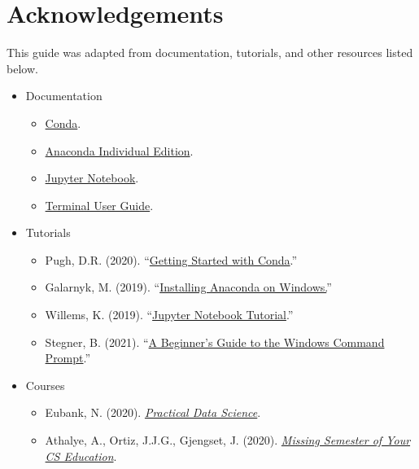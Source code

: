 \section{Acknowledgements}
This guide was adapted from documentation, tutorials, and other resources listed below.

\begin{itemize}[noitemsep,topsep=0pt]
    \item Documentation
        \begin{itemize}[noitemsep,topsep=0pt]
            \item \href{https://docs.conda.io/projects/conda/en/latest/user-guide/index.html}{Conda}.
            \item \href{https://docs.anaconda.com/anaconda/}{Anaconda Individual Edition}.
            \item \href{https://jupyter-notebook.readthedocs.io/en/stable/}{Jupyter Notebook}.
            \item \href{https://support.apple.com/guide/terminal/welcome/mac}{Terminal User Guide}. %
        \end{itemize}
    
    \item Tutorials
        \begin{itemize}[noitemsep,topsep=0pt]
            \item Pugh, D.R. (2020). ``\href{https://towardsdatascience.com/managing-project-specific-environments-with-conda-b8b50aa8be0e}{Getting Started with Conda}.'' %
            \item Galarnyk, M. (2019). ``\href{https://www.datacamp.com/community/tutorials/installing-anaconda-windows}{Installing Anaconda on Windows.}'' %
            \item Willems, K. (2019). ``\href{https://www.datacamp.com/community/tutorials/tutorial-jupyter-notebook}{Jupyter Notebook Tutorial}.'' %
            \item Stegner, B. (2021). ``\href{https://www.makeuseof.com/tag/a-beginners-guide-to-the-windows-command-line/}{A Beginner's Guide to the Windows Command Prompt}.''
        \end{itemize}
        
    \item Courses
        \begin{itemize}[noitemsep,topsep=0pt]
            \item Eubank, N. (2020).
            \textit{\href{https://www.practicaldatascience.org/html/index.html}{Practical Data Science}}.
            \item Athalye, A., Ortiz, J.J.G., Gjengset, J. (2020). \textit{\href{https://missing.csail.mit.edu/}{Missing Semester of Your CS Education}}.
        \end{itemize}
\end{itemize}
